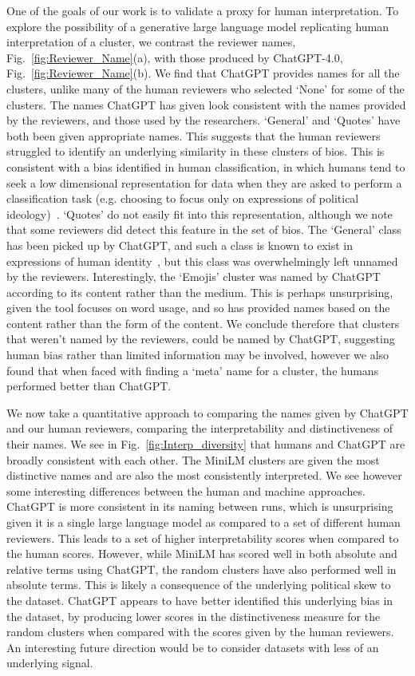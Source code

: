 \documentclass{article}
\begin{document}
One of the goals of our work is to validate a proxy for human interpretation.  To explore the possibility of a generative large language model replicating human interpretation of a cluster, we contrast the reviewer names, Fig.~\ref{fig:Reviewer_Name}(a), with those produced by ChatGPT-4.0, Fig.~\ref{fig:Reviewer_Name}(b).  We find that ChatGPT provides names for all the clusters, unlike many of the human reviewers who selected `None' for some of the clusters.  The names ChatGPT has given look consistent with the names provided by the reviewers, and those used by the researchers.  `General' and `Quotes' have both been given appropriate names.  This suggests that the human reviewers struggled to identify an underlying similarity in these clusters of bios.  This is consistent with a bias identified in human classification, in which humans tend to seek a low dimensional representation for data when they are asked to perform a classification task (e.g. choosing to focus only on expressions of political ideology)~\cite{broker2022}.  `Quotes' do not easily fit into this representation, although we note that some reviewers did detect this feature in the set of bios.  The `General' class has been picked up by ChatGPT, and such a class is known to exist in expressions of human identity~\cite{mackinnon2010}, but this class was overwhelmingly left unnamed by the reviewers.  Interestingly, the `Emojis' cluster was named by ChatGPT according to its content rather than the medium.  This is perhaps unsurprising, given the tool focuses on word usage, and so has provided names based on the content rather than the form of the content.  We conclude therefore that clusters that weren't named by the reviewers, could be named by ChatGPT, suggesting human bias rather than limited information may be involved, however we also found that when faced with finding a `meta' name for a cluster, the humans performed better than ChatGPT.



We now take a quantitative approach to comparing the names given by ChatGPT and our human reviewers, comparing the interpretability and distinctiveness of their names.
We see in Fig.~\ref{fig:Interp_diversity} that humans and ChatGPT are broadly consistent with each other. 
The MiniLM clusters are given the most distinctive names and are also the most consistently interpreted.  We see however some interesting differences between the human and machine approaches.  ChatGPT is more consistent in its naming between runs, which is unsurprising given it is a single large language model as compared to a set of different human reviewers.  This leads to a set of higher interpretability scores when compared to the human scores.  However, while MiniLM has scored well in both absolute and relative terms using ChatGPT, the random clusters have also performed well in absolute terms.  This is likely a consequence of the underlying political skew to the dataset.  ChatGPT appears to have better identified this underlying bias in the dataset, by producing lower scores in the distinctiveness measure for the random clusters when compared with the scores given by the human reviewers.  An interesting future direction would be to consider datasets with less of an underlying signal.  
\end{document}

